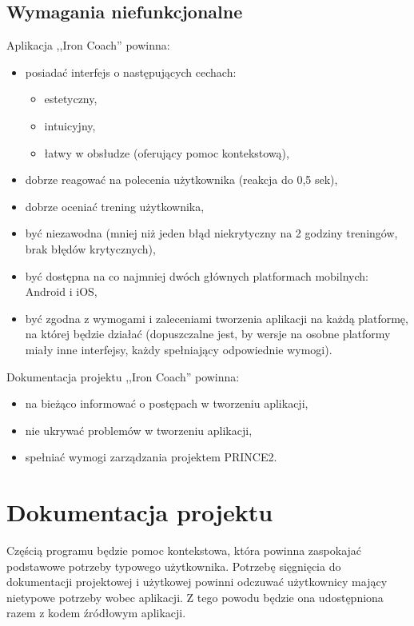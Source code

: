 \subsection{Wymagania niefunkcjonalne}
\noindent Aplikacja ,,Iron Coach'' powinna:
\begin{itemize}
  \item posiadać interfejs o następujących cechach:
    \begin{itemize}
      \item estetyczny,
      \item intuicyjny, 
      \item łatwy w obsłudze (oferujący pomoc kontekstową), 
    \end{itemize}
  \item dobrze reagować na polecenia użytkownika (reakcja do 0,5 sek),
  \item dobrze oceniać trening użytkownika,
  \item być niezawodna (mniej niż jeden błąd niekrytyczny na 2 godziny treningów, brak błędów krytycznych),
  \item być dostępna na co najmniej dwóch głównych platformach mobilnych: Android i iOS,
  \item być zgodna z wymogami i zaleceniami tworzenia aplikacji  na każdą platformę, na której będzie działać (dopuszczalne jest, by wersje na osobne platformy miały inne interfejsy, każdy spełniający odpowiednie wymogi).
\end{itemize}
\vspace{2pt}
Dokumentacja projektu ,,Iron Coach'' powinna:
\begin{itemize}
  \item na bieżąco informować o postępach w tworzeniu aplikacji,
  \item nie ukrywać problemów w tworzeniu aplikacji,
  \item spełniać wymogi zarządzania projektem PRINCE2\cite{Pr}.
\end{itemize}
\section{Dokumentacja projektu}
\noindent Częścią programu będzie pomoc kontekstowa, która powinna zaspokajać podstawowe potrzeby typowego użytkownika. Potrzebę sięgnięcia do dokumentacji projektowej i użytkowej powinni odczuwać użytkownicy mający nietypowe potrzeby wobec aplikacji. Z tego powodu będzie ona udostępniona razem z kodem źródłowym aplikacji.
